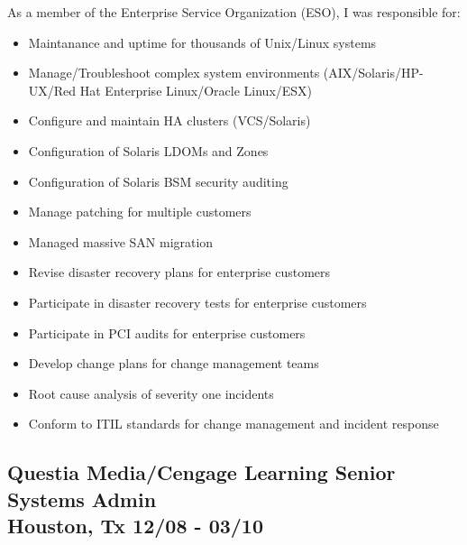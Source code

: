\documentclass{article}
\begin{document}
  As a member of the Enterprise Service Organization (ESO), I was responsible for:\\
  \begin{itemize}
  \item Maintanance and uptime for thousands of Unix/Linux systems
  \item Manage/Troubleshoot complex system environments (AIX/Solaris/HP-UX/Red Hat Enterprise Linux/Oracle Linux/ESX)
  \item Configure and maintain HA clusters (VCS/Solaris)
  \item Configuration of Solaris LDOMs and Zones
  \item Configuration of Solaris BSM security auditing
  \item Manage patching for multiple customers
  \item Managed massive SAN migration
  \item Revise disaster recovery plans for enterprise customers
  \item Participate in disaster recovery tests for enterprise customers
  \item Participate in PCI audits for enterprise customers
  \item Develop change plans for change management teams
  \item Root cause analysis of severity one incidents
  \item Conform to ITIL standards for change management and incident response
  \end{itemize}


  \subsection{Questia Media/Cengage Learning \hfill Senior Systems Admin\\
    Houston, Tx \hfill 12/08 - 03/10
  }
\end{document}
